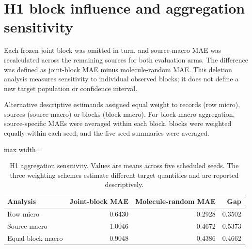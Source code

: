 \documentclass[10pt]{article}
\begin{document}
\section*{H1 block influence and aggregation sensitivity}

Each frozen joint block was omitted in turn, and source-macro MAE was recalculated across the remaining sources for both evaluation arms. The difference was defined as joint-block MAE minus molecule-random MAE. This deletion analysis measures sensitivity to individual observed blocks; it does not define a new target population or confidence interval.

Alternative descriptive estimands assigned equal weight to records (row micro), sources (source macro) or blocks (block macro). For block-macro aggregation, source-specific MAEs were averaged within each block, blocks were weighted equally within each seed, and the five seed summaries were averaged.


\begin{table}[htbp]
\centering
\caption{H1 aggregation sensitivity. Values are means across five scheduled seeds. The three weighting schemes estimate different target quantities and are reported descriptively.}
\begin{adjustbox}{max width=\textwidth}
\begin{tabular}{lrrr}
\toprule
\textbf{Analysis} & \textbf{Joint-block MAE} & \textbf{Molecule-random MAE} & \textbf{Gap} \\
\midrule
Row micro & 0.6430 & 0.2928 & 0.3502 \\
Source macro & 1.0046 & 0.4672 & 0.5373 \\
Equal-block macro & 0.9048 & 0.4386 & 0.4662 \\
\bottomrule
\end{tabular}
\end{adjustbox}
\end{table}
\end{document}
